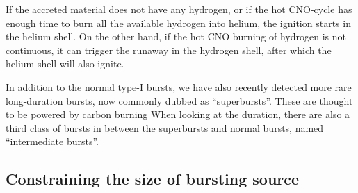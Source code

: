 If the accreted material does not have any hydrogen, or if the hot CNO-cycle has enough time to burn all the available hydrogen into helium, the ignition starts in the helium shell.
On the other hand, if the hot CNO burning of hydrogen is not continuous, it can trigger the runaway in the hydrogen shell, after which the helium shell will also ignite.


In addition to the normal type-I bursts, we have also recently detected more rare long-duration bursts, now commonly dubbed as ``superbursts''. \cite{CHK00, Kuulkers02, SB02}
These are thought to be powered by carbon burning\cite{Cumming01}
When looking at the duration, there are also a third class of bursts in between the superbursts and normal bursts, named ``intermediate bursts''.\cite{Cumming06}




\subsection{Constraining the size of bursting source}



